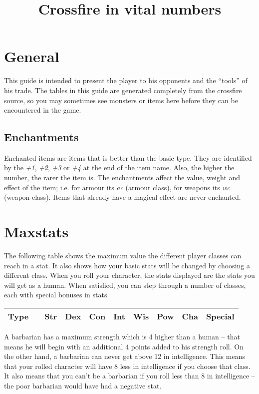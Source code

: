 \documentclass[11pt, a4paper]{article}
\begin{document}
\title{Crossfire in vital numbers}
\author{

}
\maketitle
{}
\setlongtables


\section*{General}
This guide is intended to present the player to his opponents and the
``tools'' of his trade.  The tables in this guide are generated
completely from the crossfire source, so you may sometimes see
monsters or items here before they can be encountered in the game.

\subsection*{Enchantments}
Enchanted items are items that is better than the basic type.
They are identified by the {\it +1}, {\it +2}, {\it +3} or {\it +4} at 
the end of the item name.
Also, the higher the number, the rarer the item is.
The enchantments affect the value, weight and effect of the item;
i.e. for armour its {\it ac} (armour class),
for weapons its {\it wc} (weapon class).
Items that already have a magical effect are never enchanted.


\section*{Maxstats}

The following table shows the maximum value the different player
classes can reach in a stat. It also shows how your basic stats will
be changed by choosing a different class. When you roll your
character, the stats displayed are the stats you will get as a human.
When satisfied, you can step through a number of classes, each with
special bonuses in stats.

{\small 
\begin{center}
\begin{tabular}{|c|c|l|l|l|l|l|l|l|p{4cm}|}
\hline
Type& &         Str&    Dex&    Con&    Int&    Wis&    Pow& Cha &Special\\
\hline
\hline

\hline
\end{tabular}
\end{center}
}

A barbarian has a maximum strength which is 4 higher than a human --
that means he will begin with an additional 4 points added to his
strength roll. On the other hand, a barbarian can never get above 12
in intelligence.  This means that your rolled character will have 8
less in intelligence if you choose that class.  It also means that you
can't be a barbarian if you roll less than 8 in intelligence -- the
poor barbarian would have had a negative stat.
\end{document}
